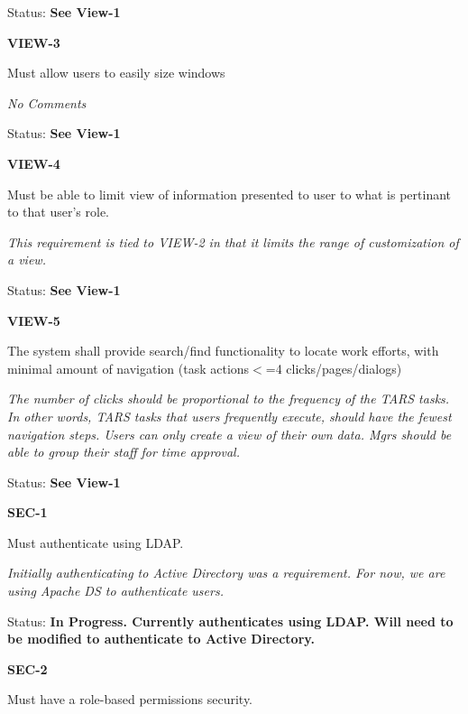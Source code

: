 Status: \textbf{See View-1}\\

\noindent 

\noindent \textbf{VIEW-3}

\noindent Must allow users to easily size windows

 \textit{No Comments}

\textit{ }Status: \textbf{See View-1}\textit{}\\

\noindent 

\noindent \textbf{VIEW-4}

\noindent Must be able to limit view of information presented to user to what is pertinant to that user's role.

\textit{This requirement is tied to VIEW-2 in that it limits the range of customization of a view.}

Status: \textbf{See View-1}\\

\noindent 

\noindent \textbf{VIEW-5}

\noindent The system shall provide search/find functionality to locate work efforts, with minimal amount of navigation (task actions$<$=4 clicks/pages/dialogs)

\noindent \textit{The number of clicks should be proportional to the frequency of the TARS tasks. In other words, TARS tasks that users frequently execute, should have the fewest navigation steps. Users can only create a view of their own data. Mgrs should be able to group their staff for time approval.}

\noindent Status: \textbf{See View-1}\\

\noindent 

\noindent \textbf{SEC-1}

\noindent Must authenticate using LDAP.

\noindent \textit{Initially authenticating to Active Directory was a requirement. For now, we are using Apache DS to authenticate users. }

\noindent Status: \textbf{In Progress.  Currently authenticates using LDAP.  Will need to be modified to authenticate to Active Directory.}\textit{}\\

\noindent \textit{}

\noindent \textbf{SEC-2}

\noindent Must have a role-based permissions security.

